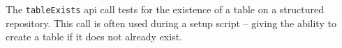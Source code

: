 The \verb+tableExists+ api call tests for the existence of a table on a structured repository. This call is often
used during a setup script -- giving the ability to create a table if it does not already exist.
